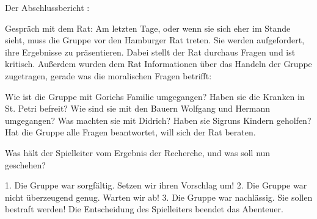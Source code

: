 










Der Abschlussbericht
:

Gespräch mit dem Rat: Am letzten Tage, oder wenn sie sich eher im Stande sieht, muss die Gruppe vor den Hamburger Rat treten. Sie werden aufgefordert, ihre Ergebnisse zu präsentieren. Dabei stellt der Rat durchaus Fragen und ist kritisch. Außerdem wurden dem Rat Informationen über das Handeln der Gruppe zugetragen, gerade was die moralischen Fragen betrifft:

Wie ist die Gruppe mit Gorichs Familie umgegangen?
Haben sie die Kranken in St. Petri befreit?
Wie sind sie mit den Bauern Wolfgang und Hermann umgegangen?
Was machten sie mit Didrich?
Haben sie Sigruns Kindern geholfen?
Hat die Gruppe alle Fragen beantwortet, will sich der Rat beraten.

Was hält der Spielleiter vom Ergebnis der Recherche, und was soll nun geschehen?

1. Die Gruppe war sorgfältig. Setzen wir ihren Vorschlag um!
2. Die Gruppe war nicht überzeugend genug. Warten wir ab!
3. Die Gruppe war nachlässig. Sie sollen bestraft werden!
Die Entscheidung des Spielleiters beendet das Abenteuer.
